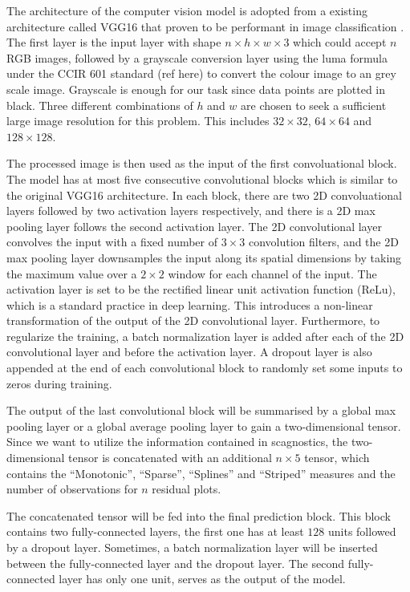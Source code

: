 \documentclass[]{interact}
\theoremstyle{plain}%
\theoremstyle{definition}
\theoremstyle{remark}
\begin{document}
The architecture of the computer vision model is adopted from a existing
architecture called VGG16 that proven to be performant in image
classification \citep{simonyan2014very}. The first layer is the input
layer with shape \(n \times h \times w \times 3\) which could accept
\(n\) RGB images, followed by a grayscale conversion layer using the
luma formula under the CCIR 601 standard (ref here) to convert the
colour image to an grey scale image. Grayscale is enough for our task
since data points are plotted in black. Three different combinations of
\(h\) and \(w\) are chosen to seek a sufficient large image resolution
for this problem. This includes \(32 \times 32\), \(64 \times 64\) and
\(128 \times 128\).

The processed image is then used as the input of the first
convoluational block. The model has at most five consecutive
convolutional blocks which is similar to the original VGG16
architecture. In each block, there are two 2D convoluational layers
followed by two activation layers respectively, and there is a 2D max
pooling layer follows the second activation layer. The 2D convolutional
layer convolves the input with a fixed number of \(3 \times 3\)
convolution filters, and the 2D max pooling layer downsamples the input
along its spatial dimensions by taking the maximum value over a
\(2 \times 2\) window for each channel of the input. The activation
layer is set to be the rectified linear unit activation function (ReLu),
which is a standard practice in deep learning. This introduces a
non-linear transformation of the output of the 2D convolutional layer.
Furthermore, to regularize the training, a batch normalization layer is
added after each of the 2D convolutional layer and before the activation
layer. A dropout layer is also appended at the end of each convolutional
block to randomly set some inputs to zeros during training.

The output of the last convolutional block will be summarised by a
global max pooling layer or a global average pooling layer to gain a
two-dimensional tensor. Since we want to utilize the information
contained in scagnostics, the two-dimensional tensor is concatenated
with an additional \(n \times 5\) tensor, which contains the
``Monotonic'', ``Sparse'', ``Splines'' and ``Striped'' measures and the
number of observations for \(n\) residual plots.

The concatenated tensor will be fed into the final prediction block.
This block contains two fully-connected layers, the first one has at
least \(128\) units followed by a dropout layer. Sometimes, a batch
normalization layer will be inserted between the fully-connected layer
and the dropout layer. The second fully-connected layer has only one
unit, serves as the output of the model.
\end{document}
